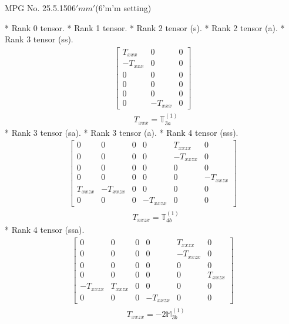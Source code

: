 \documentclass[fleqn,8pt,landscape]{jsarticle}
\begin{document}
\setcounter{MaxMatrixCols}{32}

\renewcommand{\tablename}{Table~}
\renewcommand{\figurename}{Figure~}
\begin{center}
\LARGE
MPG No. 25.5.150\quad$6'mm'$\quad(6'm'm setting)
\end{center}
* Rank 0 tensor.
* Rank 1 tensor.
* Rank 2 tensor (s).
* Rank 2 tensor (a).
* Rank 3 tensor (ss).
\begin{align*}
\begin{bmatrix} T_{xxx} & 0 & 0 \\ - T_{xxx} & 0 & 0 \\ 0 & 0 & 0 \\ 0 & 0 & 0 \\ 0 & 0 & 0 \\ 0 & - T_{xxx} & 0 \end{bmatrix}
\end{align*}
\begin{align*}
& T_{xxx} = \mathbb{T}_{3a}^{(1)}
\end{align*}
* Rank 3 tensor (sa).
* Rank 3 tensor (a).
* Rank 4 tensor (sss).
\begin{align*}
\begin{bmatrix} 0 & 0 & 0 & 0 & T_{xxzx} & 0 \\ 0 & 0 & 0 & 0 & - T_{xxzx} & 0 \\ 0 & 0 & 0 & 0 & 0 & 0 \\ 0 & 0 & 0 & 0 & 0 & - T_{xxzx} \\ T_{xxzx} & - T_{xxzx} & 0 & 0 & 0 & 0 \\ 0 & 0 & 0 & - T_{xxzx} & 0 & 0 \end{bmatrix}
\end{align*}
\begin{align*}
& T_{xxzx} = \mathbb{T}_{4b}^{(1)}
\end{align*}
* Rank 4 tensor (ssa).
\begin{align*}
\begin{bmatrix} 0 & 0 & 0 & 0 & T_{xxzx} & 0 \\ 0 & 0 & 0 & 0 & - T_{xxzx} & 0 \\ 0 & 0 & 0 & 0 & 0 & 0 \\ 0 & 0 & 0 & 0 & 0 & T_{xxzx} \\ - T_{xxzx} & T_{xxzx} & 0 & 0 & 0 & 0 \\ 0 & 0 & 0 & - T_{xxzx} & 0 & 0 \end{bmatrix}
\end{align*}
\begin{align*}
& T_{xxzx} = - 2 \mathbb{M}_{3b}^{(1)}
\end{align*}
\end{document}
